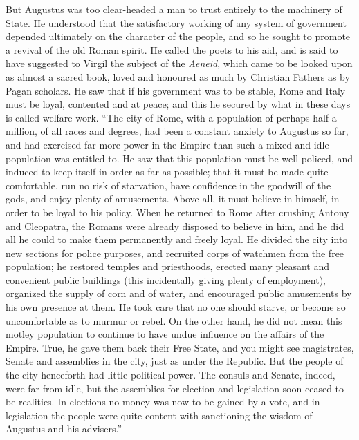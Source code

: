 \documentclass{book}
\begin{document}
But Augustus was too clear-headed a man to trust entirely to the machinery of State. He understood that the satisfactory working of any system of government depended ultimately on the character of the people, and so he sought to promote a revival of the old Roman spirit. He called the poets to his aid, and is said to have suggested to Virgil the subject of the \emph{Aeneid}, which came to be looked upon as almost a sacred book, loved and honoured as much by Christian Fathers as by Pagan scholars. He saw that if his government was to be stable, Rome and Italy must be loyal, contented and at peace; and this he secured by what in these days is called welfare work. “The city of Rome, with a population of perhaps half a million, of all races and degrees, had been a constant anxiety to Augustus so far, and had exercised far more power in the Empire than such a mixed and idle population was entitled to. He saw that this population must be well policed, and induced to keep itself in order as far as possible; that it must be made quite comfortable, run no risk of starvation, have confidence in the goodwill of the gods, and enjoy plenty of amusements. Above all, it must believe in himself, in order to be loyal to his policy. When he returned to Rome after crushing Antony and Cleopatra, the Romans were already disposed to believe in him, and he did all he could to make them permanently and freely loyal. He divided the city into new sections for police purposes, and recruited corps of watchmen from the free population; he restored temples and priesthoods, erected many pleasant and convenient public buildings (this incidentally giving plenty of employment), organized the supply of corn and of water, and encouraged public amusements by his own presence at them. He took care that no one should starve, or become so uncomfortable as to murmur or rebel. On the other hand, he did not mean this motley population to continue to have undue influence on the affairs of the Empire. True, he gave them back their Free State, and you might see magistrates, Senate and assemblies in the city, just as under the Republic. But the people of the city henceforth had little political power. The consuls and Senate, indeed, were far from idle, but the assemblies for election and legislation soon ceased to be realities. In elections no money was now to be gained by a vote, and in legislation the people were quite content with sanctioning the wisdom of Augustus and his advisers.”\footnotemark[7]
\end{document}
